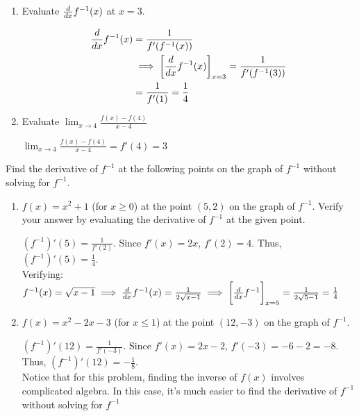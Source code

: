\documentclass[nooutcomes,handout]{ximera}
\begin{document}
\begin{problem}
\begin{enumerate}
    \item Evaluate $\frac{d}{dx} f^{-1}(x)$ at $x = 3$.
      \begin{freeResponse}
        \begin{align*}
          \frac{d}{dx} f^{-1}(x) &= \frac{1}{f'(f^{-1}(x))} \\
          &\implies \bigg[ \frac{d}{dx} f^{-1}(x) \bigg]_{x = 3} = \frac{1}{f'(f^{-1}(3))} \\
          &= \frac{1}{f'(1)} = \frac{1}{4}
        \end{align*}
      \end{freeResponse}
      
      \item Evaluate $\lim_{x \to 4} \frac{f(x)-f(4)}{x-4}$
      \begin{freeResponse}
$\lim_{x \to 4} \frac{f(x)-f(4)}{x-4} = f'(4)=3$
      \end{freeResponse}
  \end{enumerate}
\end{problem}


\begin{problem}
Find the derivative of $f^{-1}$ at the following points on the graph of $f^{-1}$  without solving for $f^{-1}$.
	\begin{enumerate}
	
	\item  $f(x) = x^2 + 1$ (for $x \geq 0$) at the point $(5,2)$ on the graph of $f^{-1}$.  Verify your answer by evaluating the derivative of $f^{-1}$ at the given point.
		\begin{freeResponse}
		$(f^{-1})'(5) = \frac{1}{f'(2)}$.  Since $f'(x) = 2x$, $f'(2) = 4$.  Thus, $(f^{-1})'(5) = \frac{1}{4}$. \\
		Verifying: $f^{-1}(x)=\sqrt{x-1} \implies \frac{d}{dx} f^{-1}(x)= \frac{1}{2\sqrt{x-1}} \implies \bigg[ \frac{d}{dx} f^{-1} \bigg]_{x=5}=\frac{1}{2\sqrt{5-1}}=\frac{1}{4}$ 
		
		
		\end{freeResponse}

	\item  $f(x) = x^2 - 2x - 3$ (for $x \leq 1$) at the point $(12, -3)$ on the graph of $f^{-1}$. 
		\begin{freeResponse}
		$(f^{-1})'(12) = \frac{1}{f'(-3)}$.  Since $f'(x) = 2x - 2$, $f'(-3) = -6 - 2 = -8$.  Thus, $(f^{-1})'(12) = - \frac{1}{8}$. \\
		Notice that for this problem, finding the inverse of $f(x)$ involves complicated algebra.  In this case, it's much easier to find the derivative of $f^{-1}$ without solving for $f^{-1}$
		\end{freeResponse}
	\end{enumerate}
\end{problem}
\end{document}
